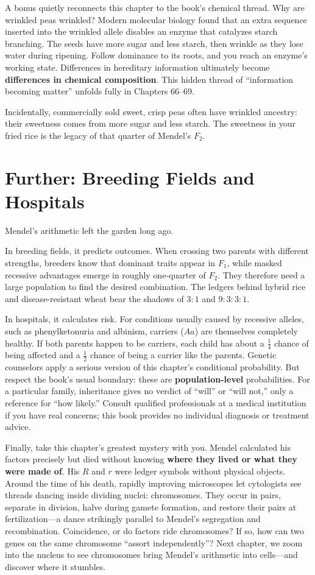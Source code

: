 A bonus quietly reconnects this chapter to the book's chemical thread. Why are wrinkled peas wrinkled? Modern molecular biology found that an extra sequence inserted into the wrinkled allele disables an enzyme that catalyzes starch branching. The seeds have more sugar and less starch, then wrinkle as they lose water during ripening. Follow dominance to its roots, and you reach an enzyme's working state. Differences in hereditary information ultimately become \textbf{differences in chemical composition}. This hidden thread of ``information becoming matter'' unfolds fully in Chapters 66--69.

Incidentally, commercially sold sweet, crisp peas often have wrinkled ancestry: their sweetness comes from more sugar and less starch. The sweetness in your fried rice is the legacy of that quarter of Mendel's $F_2$.

\section{Further: Breeding Fields and Hospitals}

Mendel's arithmetic left the garden long ago.

In breeding fields, it predicts outcomes. When crossing two parents with different strengths, breeders know that dominant traits appear in $F_1$, while masked recessive advantages emerge in roughly one-quarter of $F_2$. They therefore need a large population to find the desired combination. The ledgers behind hybrid rice and disease-resistant wheat bear the shadows of $3:1$ and $9:3:3:1$.

In hospitals, it calculates risk. For conditions usually caused by recessive alleles, such as phenylketonuria and albinism, carriers ($Aa$) are themselves completely healthy. If both parents happen to be carriers, each child has about a $\frac{1}{4}$ chance of being affected and a $\frac{1}{2}$ chance of being a carrier like the parents. Genetic counselors apply a serious version of this chapter's conditional probability. But respect the book's usual boundary: these are \textbf{population-level} probabilities. For a particular family, inheritance gives no verdict of ``will'' or ``will not,'' only a reference for ``how likely.'' Consult qualified professionals at a medical institution if you have real concerns; this book provides no individual diagnosis or treatment advice.

Finally, take this chapter's greatest mystery with you. Mendel calculated his factors precisely but died without knowing \textbf{where they lived or what they were made of}. His $R$ and $r$ were ledger symbols without physical objects. Around the time of his death, rapidly improving microscopes let cytologists see threads dancing inside dividing nuclei: chromosomes. They occur in pairs, separate in division, halve during gamete formation, and restore their pairs at fertilization---a dance strikingly parallel to Mendel's segregation and recombination. Coincidence, or do factors ride chromosomes? If so, how can two genes on the same chromosome ``assort independently''? Next chapter, we zoom into the nucleus to see chromosomes bring Mendel's arithmetic into cells---and discover where it stumbles.

